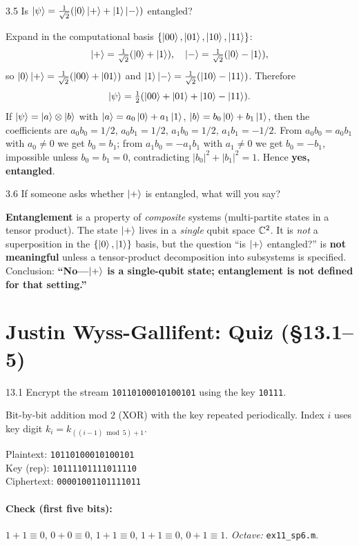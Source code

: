 \begin{exercise}{3.5}
Is $\left|\psi\right\rangle=\tfrac{1}{\sqrt{2}}(\left|0\right\rangle\left|+\right\rangle+\left|1\right\rangle\left|-\right\rangle)$ entangled?
\end{exercise}
\begin{solution}
Expand in the computational basis $\{\left|00\right\rangle,\left|01\right\rangle,\left|10\right\rangle,\left|11\right\rangle\}$:
\[
\left|+\right\rangle=\tfrac{1}{\sqrt{2}}(\left|0\right\rangle+\left|1\right\rangle),\quad \left|-\right\rangle=\tfrac{1}{\sqrt{2}}(\left|0\right\rangle-\left|1\right\rangle),
\]
so $\left|0\right\rangle\left|+\right\rangle=\tfrac{1}{\sqrt{2}}(\left|00\right\rangle+\left|01\right\rangle)$ and $\left|1\right\rangle\left|-\right\rangle=\tfrac{1}{\sqrt{2}}(\left|10\right\rangle-\left|11\right\rangle)$. Therefore
\[
\left|\psi\right\rangle=\tfrac{1}{2}(\left|00\right\rangle+\left|01\right\rangle+\left|10\right\rangle-\left|11\right\rangle).
\]
If $\left|\psi\right\rangle=\left|a\right\rangle\otimes\left|b\right\rangle$ with $\left|a\right\rangle=a_0\left|0\right\rangle+a_1\left|1\right\rangle$, $\left|b\right\rangle=b_0\left|0\right\rangle+b_1\left|1\right\rangle$, then the coefficients are $a_0b_0=1/2$, $a_0b_1=1/2$, $a_1b_0=1/2$, $a_1b_1=-1/2$. From $a_0b_0=a_0b_1$ with $a_0\neq 0$ we get $b_0=b_1$; from $a_1b_0=-a_1b_1$ with $a_1\neq 0$ we get $b_0=-b_1$, impossible unless $b_0=b_1=0$, contradicting $|b_0|^2+|b_1|^2=1$. Hence \textbf{yes, entangled}.
\end{solution}

\begin{exercise}{3.6}
If someone asks whether $\left|+\right\rangle$ is entangled, what will you say?
\end{exercise}
\begin{solution}
\textbf{Entanglement} is a property of \emph{composite} systems (multi-partite states in a tensor product). The state $\left|+\right\rangle$ lives in a \emph{single} qubit space $\mathbb{C}^2$. It is \emph{not} a superposition in the $\{\left|0\right\rangle,\left|1\right\rangle\}$ basis, but the question ``is $\left|+\right\rangle$ entangled?'' is \textbf{not meaningful} unless a tensor-product decomposition into subsystems is specified. Conclusion: \textbf{``No---$\left|+\right\rangle$ is a single-qubit state; entanglement is not defined for that setting.''}
\end{solution}

\section*{Justin Wyss-Gallifent: Quiz (\S13.1--5)}

\begin{exercise}{13.1}
Encrypt the stream \texttt{10110100010100101} using the key \texttt{10111}.
\end{exercise}
\begin{solution}
Bit-by-bit addition mod $2$ (XOR) with the key repeated periodically. Index $i$ uses key digit $k_i = k_{((i-1)\bmod 5)+1}$.

Plaintext: \texttt{10110100010100101}\\
Key (rep): \texttt{10111101111011110}\\
Ciphertext: \texttt{00001001101111011}

\paragraph{Check (first five bits):} $1\!+\!1\equiv 0$, $0\!+\!0\equiv 0$, $1\!+\!1\equiv 0$, $1\!+\!1\equiv 0$, $0\!+\!1\equiv 1$. \textit{Octave:} \texttt{ex11\_sp6.m}.
\end{solution}

